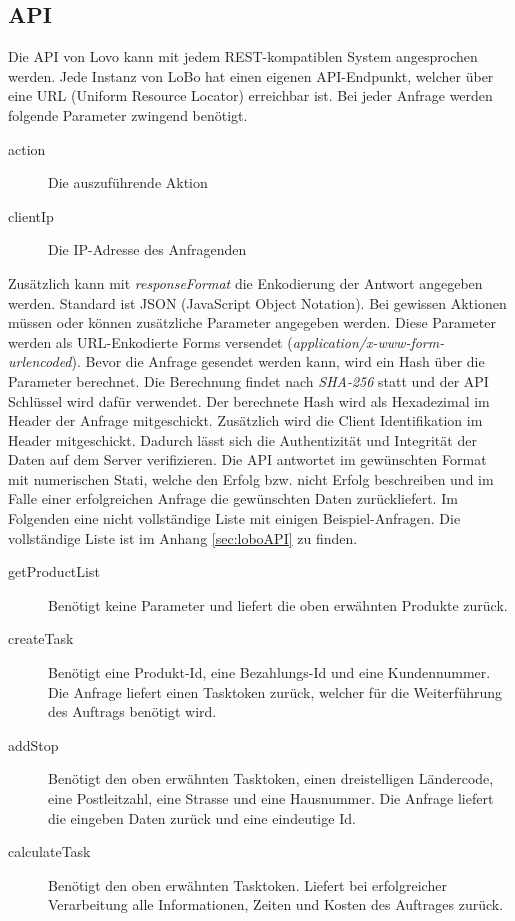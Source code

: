 \subsection{API}

Die API von Lovo kann mit jedem REST-kompatiblen System angesprochen werden. Jede Instanz von LoBo hat einen eigenen API-Endpunkt, welcher über eine URL (Uniform Resource Locator) erreichbar ist. Bei jeder Anfrage werden folgende Parameter zwingend benötigt.
\begin{description}
	\item[action] Die auszuführende Aktion
	\item[clientIp] Die IP-Adresse des Anfragenden
\end{description}
Zusätzlich kann mit \textit{responseFormat} die Enkodierung der Antwort angegeben werden. Standard ist JSON (JavaScript Object Notation). Bei gewissen Aktionen müssen oder können zusätzliche Parameter angegeben werden. Diese Parameter werden als URL-Enkodierte Forms versendet (\textit{application/x-www-form-urlencoded}).
Bevor die Anfrage gesendet werden kann, wird ein Hash über die Parameter berechnet. Die Berechnung findet nach \textit{SHA-256} statt und der API Schlüssel wird dafür verwendet. Der berechnete Hash wird als Hexadezimal im Header der Anfrage mitgeschickt. Zusätzlich wird die Client Identifikation im Header mitgeschickt. Dadurch lässt sich die Authentizität und Integrität der Daten auf dem Server verifizieren. Die API antwortet im gewünschten Format mit numerischen Stati, welche den Erfolg bzw. nicht Erfolg beschreiben und im Falle einer erfolgreichen Anfrage die gewünschten Daten zurückliefert. Im Folgenden eine nicht vollständige Liste mit einigen Beispiel-Anfragen. Die vollständige Liste ist im Anhang \ref{sec:loboAPI} zu finden.

\begin{description}
	\item[getProductList] Benötigt keine Parameter und liefert die oben erwähnten Produkte zurück.
	\item[createTask] Benötigt eine Produkt-Id, eine Bezahlungs-Id und eine Kundennummer. Die Anfrage liefert einen Tasktoken zurück, welcher für die Weiterführung des Auftrags benötigt wird.
	\item[addStop] Benötigt den oben erwähnten Tasktoken, einen dreistelligen Ländercode, eine Postleitzahl, eine Strasse und eine Hausnummer. Die Anfrage liefert die eingeben Daten zurück und eine eindeutige Id.
	\item[calculateTask] Benötigt den oben erwähnten Tasktoken. Liefert bei erfolgreicher Verarbeitung alle Informationen, Zeiten und Kosten des Auftrages zurück.
\end{description}
